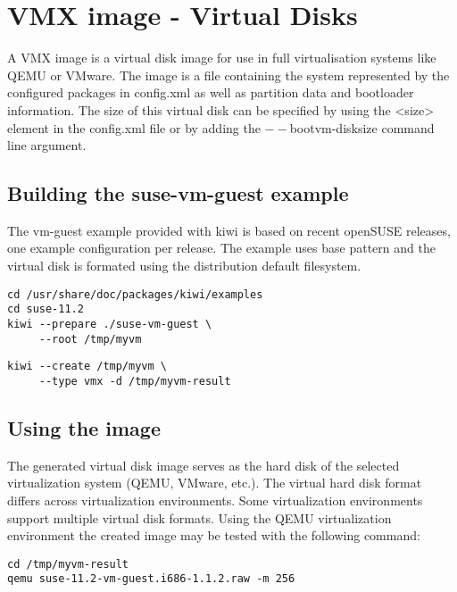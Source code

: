 \chapter{VMX image - Virtual Disks}
\label{chapter:vmx}
\minitoc

A VMX image is a virtual disk image for use in full virtualisation
systems like QEMU or VMware. The image is a file containing the
system represented by the configured packages in config.xml as well
as partition data and bootloader information. The size of
this virtual disk can be specified by using the <size> element
in the config.xml file or by adding the $--$bootvm-disksize command
line argument.

\section{Building the suse-vm-guest example}

The vm-guest example provided with kiwi is based on recent openSUSE releases,
one example configuration per release. The example uses base pattern and the
virtual disk is formated using the distribution default filesystem.

\begin{Command}{12cm}
\begin{verbatim}
cd /usr/share/doc/packages/kiwi/examples
cd suse-11.2
kiwi --prepare ./suse-vm-guest \
     --root /tmp/myvm
\end{verbatim}
\end{Command}

\begin{Command}{12cm}
\begin{verbatim}
kiwi --create /tmp/myvm \
     --type vmx -d /tmp/myvm-result
\end{verbatim}
\end{Command}

\section{Using the image}

The generated virtual disk image serves as the hard disk of the selected
virtualization system (QEMU, VMware, etc.). The virtual hard disk format 
differs across virtualization environments. Some virtualization environments
support multiple virtual disk formats. Using the QEMU virtualization 
environment the created image may be tested with the following command:

\begin{Command}{12cm}
\begin{verbatim}
cd /tmp/myvm-result
qemu suse-11.2-vm-guest.i686-1.1.2.raw -m 256
\end{verbatim}
\end{Command}

